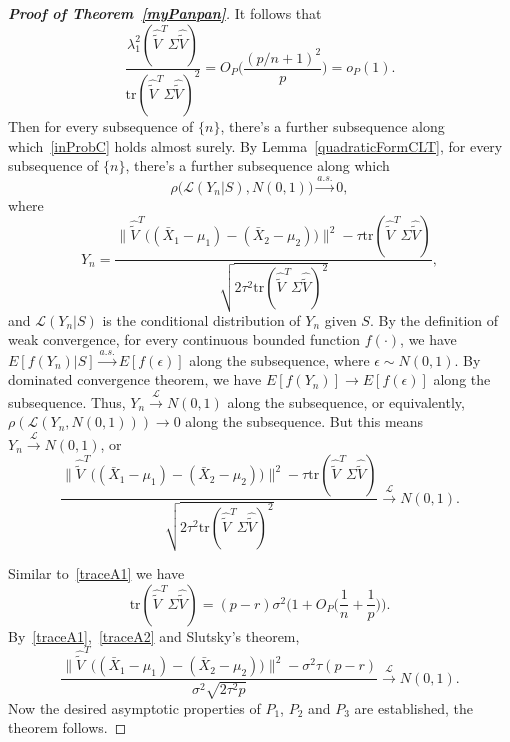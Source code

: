 \documentclass[review]{elsarticle}
\theoremstyle{plain}
\theoremstyle{definition}
\theoremstyle{remark}
\begin{document}
\begin{proof}[\textbf{Proof of Theorem~\ref{myPanpan}}]
    It follows that
\begin{equation}\label{inProbC}
        \frac{\lambda_1^2(\hat{\tilde{V}}^T\Sigma\hat{\tilde{V}})}{\mathrm{tr}(\hat{\tilde{V}}^T\Sigma\hat{\tilde{V}})^2}
        =O_P\Big(\frac{{(p/n+1)}^2}{p}\Big)=o_P(1).
\end{equation}
Then for every subsequence of $\{n\}$, there's a further subsequence along which~\eqref{inProbC} holds almost surely.
By Lemma~\ref{quadraticFormCLT}, for every subsequence of $\{n\}$, there's a further subsequence along which
\begin{equation}\label{aseq}
    \rho\big(\mathcal{L}( Y_n |S),N(0,1)\big)\xrightarrow{a.s.}0,
\end{equation}
where 
$$
Y_n=\frac{\|\hat{\tilde{V}}^T\big((\bar{X}_1-\mu_1)-(\bar{X}_2-\mu_2)\big)\|^2-\tau\mathrm{tr}(\hat{\tilde{V}}^T\Sigma\hat{\tilde{V}})}{\sqrt{2\tau^2\mathrm{tr}(\hat{\tilde{V}}^T\Sigma\hat{\tilde{V}})^2}},
$$
and $\mathcal{L}(Y_n|S)$ is the conditional distribution of $Y_n$ given $S$.
By the definition of weak convergence, for every continuous bounded function $f(\cdot)$, we have $E[f(Y_n)|S]\xrightarrow{a.s.}E[f(\epsilon)]$ along the subsequence, where $\epsilon\sim N(0,1)$.
By dominated convergence theorem, we have $E[f(Y_n)]\to E[f(\epsilon)]$ along the subsequence.
Thus, $Y_n\xrightarrow{\mathcal{L}}N(0,1)$ along the subsequence, or equivalently, $\rho(\mathcal{L}(Y_n,N(0,1)))\to 0$ along the subsequence. But this means $Y_n\xrightarrow{\mathcal{L}}N(0,1)$, or
$$
\frac{\|\hat{\tilde{V}}^T\big((\bar{X}_1-\mu_1)-(\bar{X}_2-\mu_2)\big)\|^2-\tau\mathrm{tr}(\hat{\tilde{V}}^T\Sigma\hat{\tilde{V}})}{\sqrt{2\tau^2\mathrm{tr}(\hat{\tilde{V}}^T\Sigma\hat{\tilde{V}})^2}}\xrightarrow{\mathcal{L}}N(0,1).
$$

Similar to~\eqref{traceA1} we have
\begin{equation}\label{traceA2}
    \mathrm{tr}(\hat{\tilde{V}}^T\Sigma\hat{\tilde{V}})=(p-r)\sigma^2\big(1+O_P\big(\frac{1}{n}+\frac{1}{p}\big)\big).
\end{equation}
By~\eqref{traceA1},~\eqref{traceA2} and Slutsky's theorem,
$$
\frac{\|\hat{\tilde{V}}^T\big((\bar{X}_1-\mu_1)-(\bar{X}_2-\mu_2)\big)\|^2-\sigma^2\tau(p-r) }{\sigma^2\sqrt{2\tau^2 p}}\xrightarrow{\mathcal{L}}N(0,1).
$$
Now the desired asymptotic properties of $P_1$, $P_2$ and $P_3$ are established, the theorem follows.
\end{proof}
\end{document}
